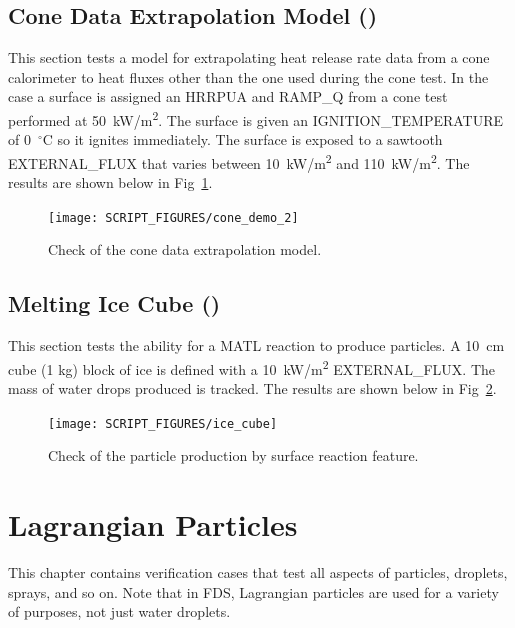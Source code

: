 \documentclass[11pt]{book}
\begin{document}
\newpage

\section{Cone Data Extrapolation Model (\texorpdfstring{}{cone\_demo\_2})}
\label{cone_demo_2}

This section tests a model for extrapolating heat release rate data from a cone calorimeter to heat fluxes other than the one used during the cone test. In the case a surface is assigned an {\ct HRRPUA} and {\ct RAMP\_Q} from a cone test performed at 50~\si{kW/m^2}. The surface is given an {\ct IGNITION\_TEMPERATURE} of 0~$^\circ$C so it ignites immediately. The surface is exposed to a sawtooth {\ct EXTERNAL\_FLUX} that varies between 10~\si{kW/m^2} and 110~\si{kW/m^2}. The results are shown below in Fig~\ref{fig:cone_demo_2}.

\begin{figure}[!ht]
	\centering
	\texttt{[image: SCRIPT\_FIGURES/cone\_demo\_2]}
	\caption[Cone data extrapolation model (the {\ct cone\_demo\_2} case)]{Check of the cone data extrapolation model.}
	\label{fig:cone_demo_2}
\end{figure}

\section{Melting Ice Cube (\texorpdfstring{}{ice\_cube})}
\label{ice_cube}

This section tests the ability for a {\ct MATL} reaction to produce particles. A 10~cm cube (1 kg) block of ice is defined with a 10~\si{kW/m^2} {\ct EXTERNAL\_FLUX}. The mass of water drops produced is tracked. The results are shown below in Fig~\ref{fig:ice_cube}.

\begin{figure}[!ht]
	\centering
	\texttt{[image: SCRIPT\_FIGURES/ice\_cube]}
	\caption[Check of the particle production by surface reaction feature (the {\ct ice\_cube} case)]{Check of the particle production by surface reaction feature.}
	\label{fig:ice_cube}
\end{figure}


\chapter{Lagrangian Particles}

This chapter contains verification cases that test all aspects of particles, droplets, sprays, and so on. Note that in FDS, Lagrangian particles are used for a variety of purposes, not just water droplets.
\end{document}
